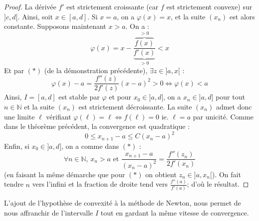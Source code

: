   \begin{proof}
    La dérivée $f'$ est strictement croissante (car $f$ est strictement convexe) sur $]c, d[$. Ainsi, soit $x \in [a, d]$. Si $x = a$, on a $\varphi(x) = x$, et la suite $(x_n)$ est alors constante. Supposons maintenant $x > a$. On a :
    \[ \varphi(x) = x - \frac{\overbrace{f(x)}^{> 0}}{\underbrace{f'(x)}_{> 0}} < x \]
    Et par $(*)$ (de la démonstration précédente), $\exists z \in ]a, x[$ :
    \[ \varphi(x) - a = \frac{f''(z)}{2f'(z)} (x-a)^2 > 0 \iff \varphi(x) < a \]
    Ainsi, $I = [a, d]$ est stable par $\varphi$ et pour $x_0 \in ]a, d]$, on a $x_n \in ]a, d]$ pour tout $n \in \mathbb{N}$ et la suite $(x_n)$ est strictement décroissante. La suite $(x_n)$ admet donc une limite $\ell$ vérifiant $\varphi(\ell) = \ell \iff f(\ell) = 0$ ie. $\ell = a$ par unicité. Comme dans le théorème précédent, la convergence est quadratique :
    \[ 0 \leq x_{n+1} - a \leq C (x_n - a)^2 \]
    Enfin, si $x_0 \in ]a, d]$, on a comme dans $(*)$ :
    \[ \forall n \in \mathbb{N}, \, x_n > a \text{ et } \frac{x_{n+1} - a}{(x_n - a)^2} = \frac{f''(z_n)}{2f'(x_n)} \]
    (en faisant la même démarche que pour $(*)$ on obtient $z_n \in ]a, x_n[$). On fait tendre $n$ vers l'infini et la fraction de droite tend vers $\frac{f''(a)}{f'(a)}$; d'où le résultat.
  \end{proof}

  \begin{remark}
    L'ajout de l'hypothèse de convexité à la méthode de Newton, nous permet de nous affranchir de l'intervalle $I$ tout en gardant la même vitesse de convergence.
  \end{remark}

